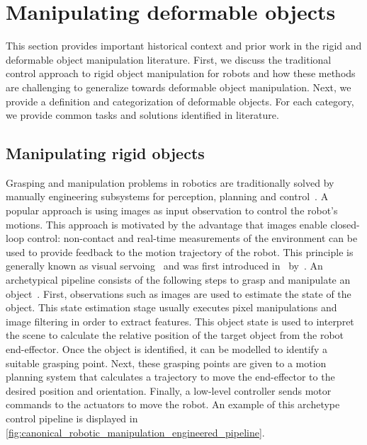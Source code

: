 \section{Manipulating deformable objects} \label{sec:lit_traditional}

This section provides important historical context and prior work in the rigid and deformable object manipulation literature. First, we discuss the traditional control approach to rigid object manipulation for robots and how these methods are challenging to generalize towards deformable object manipulation. Next, we provide a definition and categorization of deformable objects. For each category, we provide common tasks and solutions identified in literature.

\subsection{Manipulating rigid objects}
Grasping and manipulation problems in robotics are traditionally solved by manually engineering subsystems for perception, planning and control~\autocite{Siciliano2008}. A popular approach is using images as input observation to control the robot's motions. This approach is motivated by the advantage that images enable closed-loop control: non-contact and real-time measurements of the environment can be used to provide feedback to the motion trajectory of the robot. This principle is generally known as visual servoing~\autocite{Hutchinson1996} and was first introduced in~\citeyear{Hill1979} by~\textcite{Hill1979}. An archetypical pipeline consists of the following steps to grasp and manipulate an object~\autocite{Corke1996}. First, observations such as images are used to estimate the state of the object. This state estimation stage usually executes pixel manipulations and image filtering in order to extract features. This object state is used to interpret the scene to calculate the relative position of the target object from the robot end-effector. Once the object is identified, it can be modelled to identify a suitable grasping point. Next, these grasping points are given to a motion planning system that calculates a trajectory to move the end-effector to the desired position and orientation. Finally, a low-level controller sends motor commands to the actuators to move the robot. An example of this archetype control pipeline is displayed in \cref{fig:canonical_robotic_manipulation_engineered_pipeline}.

